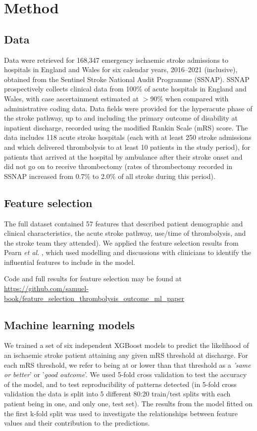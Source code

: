 \section{Method}

\subsection{Data}

Data were retrieved for 168,347 emergency ischaemic stroke admissions to hospitals in England and Wales for six calendar years, 2016–2021 (inclusive), obtained from the Sentinel Stroke National Audit Programme (SSNAP). SSNAP prospectively collects clinical data from 100\% of acute hospitals in England and Wales, with case ascertainment estimated at $>$90\% when compared with administrative coding data. Data fields were provided for the hyperacute phase of the stroke pathway, up to and including the primary outcome of disability at inpatient discharge, recorded using the modified Rankin Scale (mRS) score. The data includes 118 acute stroke hospitals (each with at least 250 stroke admissions and which delivered thrombolysis to at least 10 patients in the study period), for patients that arrived at the hospital by ambulance after their stroke onset and did not go on to receive thrombectomy (rates of thrombectomy recorded in SSNAP increased from 0.7\% to 2.0\% of all stroke during this period).

\subsection{Feature selection}

The full dataset contained 57 features that described patient demographic and clinical characteristics, the acute stroke pathway, use/time of thrombolysis, and the stroke team they attended). We applied the feature selection results from Pearn \textit{et al}. \cite{pearn_are_2024}, which used modelling and discussions with clinicians to identify the influential features to include in the model.

Code and full results for feature selection may be found at \url{https://github.com/samuel-book/feature_selection_thrombolysis_outcome_ml_paper}

\subsection{Machine learning models}

We trained a set of six independent XGBoost models \cite{chen_xgboost_2016} to predict the likelihood of an ischaemic stroke patient attaining any given mRS threshold at discharge. For each mRS threshold, we refer to being at or lower than that threshold as a \textit{'same or better}' or '\textit{good outcome}'. We used 5-fold cross validation to test the accuracy of the model, and to test reproducibility of patterns detected (in 5-fold cross validation the data is split into 5 different 80:20 train/test splits with each patient being in one, and only one, test set). The results from the model fitted on the first k-fold split was used to investigate the relationships between feature values and their contribution to the predictions.

